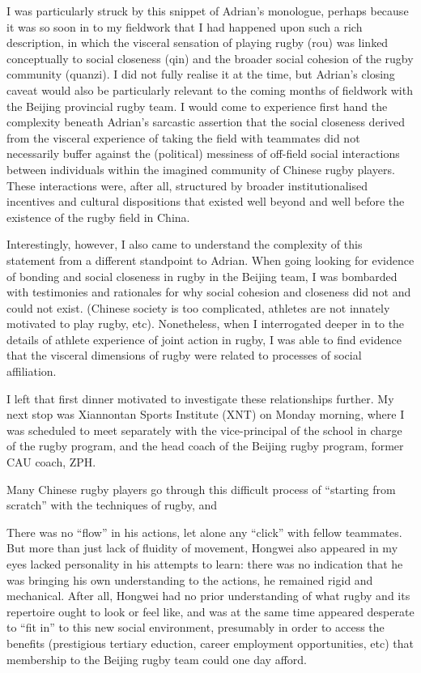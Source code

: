 I was particularly struck by this snippet of Adrian's monologue, perhaps because it was so soon in to my fieldwork that I had happened upon such a rich description, in which the visceral sensation of playing rugby (rou) was linked conceptually to social closeness (qin) and the broader social cohesion of the rugby community (quanzi).  I did not fully realise it at the time, but Adrian's closing caveat would also be particularly relevant to the coming months of fieldwork with the Beijing provincial rugby team. I would come to experience first hand the complexity beneath Adrian's sarcastic assertion that the social closeness derived from the visceral experience of taking the field with teammates did not necessarily buffer against the (political) messiness of off-field social interactions between individuals within the imagined community of Chinese rugby players.  These interactions were, after all, structured by broader institutionalised incentives and cultural dispositions that existed well beyond and well before the existence of the rugby field in China.

Interestingly, however, I also came to understand the complexity of this statement from a different standpoint to Adrian.  When going looking for evidence of bonding and social closeness in rugby in the Beijing team, I was bombarded with testimonies and rationales for why social cohesion and closeness did not and could not exist.  (Chinese society is too complicated, athletes are not innately motivated to play rugby, etc).  Nonetheless, when I interrogated deeper in to the details of athlete experience of joint action in rugby, I was able to find evidence that the visceral dimensions of rugby were related to processes of social affiliation.

I left that first dinner motivated to investigate these relationships further.  My next stop was Xiannontan Sports Institute (XNT) on Monday morning, where I was scheduled to meet separately with the vice-principal of the school in charge of the rugby program, and the head coach of the Beijing rugby program, former CAU coach, ZPH.








Many Chinese rugby players go through this difficult process of ``starting from scratch'' with the techniques of rugby, and

There was no ``flow'' in his actions, let alone any ``click'' with fellow teammates.  But more than just lack of fluidity of movement, Hongwei also appeared in my eyes lacked personality in his attempts to learn: there was no indication that he was bringing his own understanding to the actions, he remained rigid and mechanical.  After all, Hongwei had no prior understanding of what rugby and its repertoire ought to look or feel like, and was at the same time appeared desperate to ``fit in'' to this new social environment, presumably in order to access the benefits (prestigious tertiary eduction, career employment opportunities, etc) that membership to the Beijing rugby team could one day afford.
